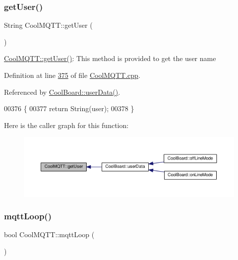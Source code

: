 \subsubsection{\texorpdfstring{get\+User()}{getUser()}}
{\footnotesize\ttfamily String Cool\+M\+Q\+T\+T\+::get\+User (\begin{DoxyParamCaption}{ }\end{DoxyParamCaption})}

\hyperlink{class_cool_m_q_t_t_a373cc92fca7760d886f02d8a6e5b3f63}{Cool\+M\+Q\+T\+T\+::get\+User()}\+: This method is provided to get the user name 

Definition at line \hyperlink{_cool_m_q_t_t_8cpp_source_l00375}{375} of file \hyperlink{_cool_m_q_t_t_8cpp_source}{Cool\+M\+Q\+T\+T.\+cpp}.



Referenced by \hyperlink{_cool_board_8cpp_source_l00548}{Cool\+Board\+::user\+Data()}.


\begin{DoxyCode}
00376 \{
00377     \textcolor{keywordflow}{return} String(user);
00378 \}
\end{DoxyCode}
Here is the caller graph for this function\+:
\nopagebreak
\begin{figure}[H]
\begin{center}
\leavevmode
\includegraphics[width=350pt]{class_cool_m_q_t_t_a373cc92fca7760d886f02d8a6e5b3f63_icgraph}
\end{center}
\end{figure}
\mbox{\label{class_cool_m_q_t_t_aa5eaae967b562b62cbcf2b8d81f6e5d5}} 
\subsubsection{\texorpdfstring{mqtt\+Loop()}{mqttLoop()}}
{\footnotesize\ttfamily bool Cool\+M\+Q\+T\+T\+::mqtt\+Loop (\begin{DoxyParamCaption}{ }\end{DoxyParamCaption})}

